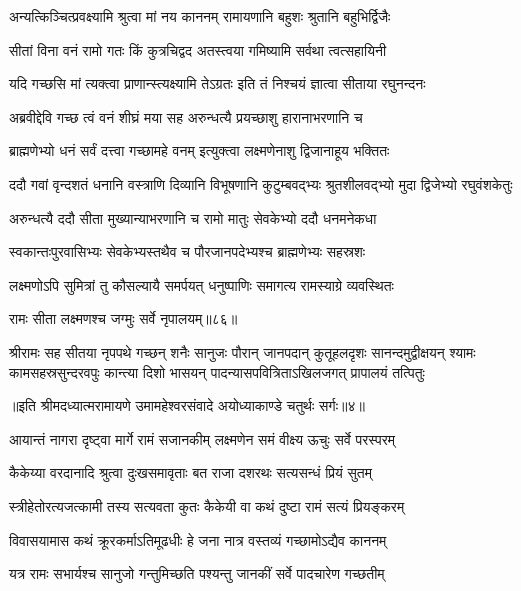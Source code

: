 \twolineshloka
{अन्यत्किञ्चित्प्रवक्ष्यामि श्रुत्वा मां नय काननम्}
{रामायणानि बहुशः श्रुतानि बहुभिर्द्विजैः} %

\twolineshloka
{सीतां विना वनं रामो गतः किं कुत्रचिद्वद}
{अतस्त्वया गमिष्यामि सर्वथा त्वत्सहायिनी} %

\twolineshloka
{यदि गच्छसि मां त्यक्त्वा प्राणान्स्त्यक्ष्यामि तेऽग्रतः}
{इति तं निश्चयं ज्ञात्वा सीताया रघुनन्दनः} %

\twolineshloka
{अब्रवीद्देवि गच्छ त्वं वनं शीघ्रं मया सह}
{अरुन्धत्यै प्रयच्छाशु हारानाभरणानि च} %

\twolineshloka
{ब्राह्मणेभ्यो धनं सर्वं दत्त्वा गच्छामहे वनम्}
{इत्युक्त्वा लक्ष्मणेनाशु द्विजानाहूय भक्तितः} %

\fourlineindentedshloka
{ददौ गवां वृन्दशतं धनानि}
{वस्त्राणि दिव्यानि विभूषणानि}
{कुटुम्बवद्भ्यः श्रुतशीलवद्भ्यो}
{मुदा द्विजेभ्यो रघुवंशकेतुः} %

\twolineshloka
{अरुन्धत्यै ददौ सीता मुख्यान्याभरणानि च}
{रामो मातुः सेवकेभ्यो ददौ धनमनेकधा} %

\twolineshloka
{स्वकान्तःपुरवासिभ्यः सेवकेभ्यस्तथैव च}
{पौरजानपदेभ्यश्च ब्राह्मणेभ्यः सहस्रशः} %

\twolineshloka
{लक्ष्मणोऽपि सुमित्रां तु कौसल्यायै समर्पयत्}
{धनुष्पाणिः समागत्य रामस्याग्रे व्यवस्थितः} %

{रामः सीता लक्ष्मणश्च जग्मुः सर्वे नृपालयम्॥८६॥} %

{श्रीरामः सह सीतया नृपपथे गच्छन् शनैः सानुजः}
{पौरान् जानपदान् कुतूहलदृशः सानन्दमुद्वीक्षयन्}
{श्यामः कामसहस्रसुन्दरवपुः कान्त्या दिशो भासयन्}
{पादन्यासपवित्रिताऽखिलजगत् प्रापालयं तत्पितुः} %

{॥इति श्रीमदध्यात्मरामायणे उमामहेश्वरसंवादे
अयोध्याकाण्डे चतुर्थः सर्गः॥४॥
}




\twolineshloka
{आयान्तं नागरा दृष्ट्वा मार्गे रामं सजानकीम्}
{लक्ष्मणेन समं वीक्ष्य ऊचुः सर्वे परस्परम्} %

\twolineshloka
{कैकेय्या वरदानादि श्रुत्वा दुःखसमावृताः}
{बत राजा दशरथः सत्यसन्धं प्रियं सुतम्} %

\twolineshloka
{स्त्रीहेतोरत्यजत्कामी तस्य सत्यवता कुतः}
{कैकेयी वा कथं दुष्टा रामं सत्यं प्रियङ्करम्} %

\twolineshloka
{विवासयामास कथं क्रूरकर्माऽतिमूढधीः}
{हे जना नात्र वस्तव्यं गच्छामोऽद्यैव काननम्} %

\twolineshloka
{यत्र रामः सभार्यश्च सानुजो गन्तुमिच्छति}
{पश्यन्तु जानकीं सर्वे पादचारेण गच्छतीम्} %

